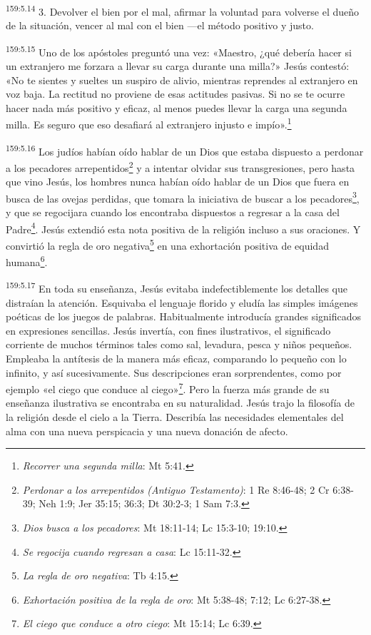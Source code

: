 \par
\textsuperscript{159:5.14} 3. Devolver el bien por el mal, afirmar la voluntad para volverse el dueño de la situación, vencer al mal con el bien ---el método positivo y justo.

\par
\textsuperscript{159:5.15} Uno de los apóstoles preguntó una vez: «Maestro, ¿qué debería hacer si un extranjero me forzara a llevar su carga durante una milla?» Jesús contestó: «No te sientes y sueltes un suspiro de alivio, mientras reprendes al extranjero en voz baja. La rectitud no proviene de esas actitudes pasivas. Si no se te ocurre hacer nada más positivo y eficaz, al menos puedes llevar la carga una segunda milla. Es seguro que eso desafiará al extranjero injusto e impío».\footnote{\textit{Recorrer una segunda milla}: Mt 5:41.}

\par
\textsuperscript{159:5.16} Los judíos habían oído hablar de un Dios que estaba dispuesto a perdonar a los pecadores arrepentidos\footnote{\textit{Perdonar a los arrepentidos (Antiguo Testamento)}: 1 Re 8:46-48; 2 Cr 6:38-39; Neh 1:9; Jer 35:15; 36:3; Dt 30:2-3; 1 Sam 7:3.} y a intentar olvidar sus transgresiones, pero hasta que vino Jesús, los hombres nunca habían oído hablar de un Dios que fuera en busca de las ovejas perdidas, que tomara la iniciativa de buscar a los pecadores\footnote{\textit{Dios busca a los pecadores}: Mt 18:11-14; Lc 15:3-10; 19:10.}, y que se regocijara cuando los encontraba dispuestos a regresar a la casa del Padre\footnote{\textit{Se regocija cuando regresan a casa}: Lc 15:11-32.}. Jesús extendió esta nota positiva de la religión incluso a sus oraciones. Y convirtió la regla de oro negativa\footnote{\textit{La regla de oro negativa}: Tb 4:15.} en una exhortación positiva de equidad humana\footnote{\textit{Exhortación positiva de la regla de oro}: Mt 5:38-48; 7:12; Lc 6:27-38.}.

\par
\textsuperscript{159:5.17} En toda su enseñanza, Jesús evitaba indefectiblemente los detalles que distraían la atención. Esquivaba el lenguaje florido y eludía las simples imágenes poéticas de los juegos de palabras. Habitualmente introducía grandes significados en expresiones sencillas. Jesús invertía, con fines ilustrativos, el significado corriente de muchos términos tales como sal, levadura, pesca y niños pequeños. Empleaba la antítesis de la manera más eficaz, comparando lo pequeño con lo infinito, y así sucesivamente. Sus descripciones eran sorprendentes, como por ejemplo «el ciego que conduce al ciego»\footnote{\textit{El ciego que conduce a otro ciego}: Mt 15:14; Lc 6:39.}. Pero la fuerza más grande de su enseñanza ilustrativa se encontraba en su naturalidad. Jesús trajo la filosofía de la religión desde el cielo a la Tierra. Describía las necesidades elementales del alma con una nueva perspicacia y una nueva donación de afecto.


